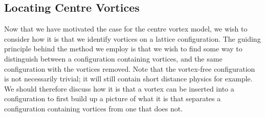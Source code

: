 \subsection{Locating Centre Vortices}\label{sec:LocatingVortices}
Now that we have motivated the case for the centre vortex model, we wish to consider how it is that we identify vortices on a lattice configuration. The guiding principle behind the method we employ is that we wish to find some way to distinguish between a configuration containing vortices, and the same configuration with the vortices removed. Note that the vortex-free configuration is not necessarily trivial; it will still contain short distance physics for example. We should therefore discuss how it is that a vortex can be inserted into a configuration to first build up a picture of what it is that separates a configuration containing vortices from one that does not.\\

